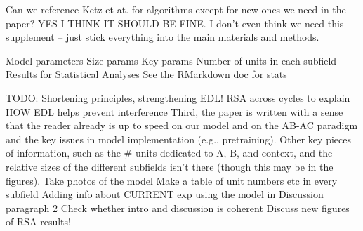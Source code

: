 \documentclass[11pt,twoside]{article}
\newif\myifpdf
\begin{document}
Can we reference Ketz et at. for algorithms except for new ones we need in the paper? YES I THINK IT SHOULD BE FINE.  I don't even think we need this supplement -- just stick everything into the main materials and methods.

Model parameters
Size params
Key params
Number of units in each subfield
Results for Statistical Analyses
See the RMarkdown doc for stats


TODO:
Shortening principles, strengthening EDL!
RSA across cycles to explain HOW EDL helps prevent interference 
Third, the paper is written with a sense that the reader already is up to speed on our model and on the AB-AC paradigm and the key issues in model implementation (e.g., pretraining). Other key pieces of information, such as the \# units dedicated to A, B, and context, and the relative sizes of the different subfields isn't there (though this may be in the figures).  
Take photos of the model
Make a table of unit numbers etc in every subfield
Adding info about CURRENT exp using the model in Discussion paragraph 2
Check whether intro and discussion is coherent
Discuss new figures of RSA results!


\end{document}
